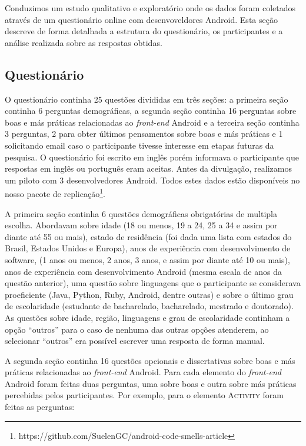 Conduzimos um estudo qualitativo e explorat\'orio onde os dados foram coletados atrav\'es de um question\'ario online com desenvoveldores Android. Esta se\c{c}\~ao descreve de forma detalhada a estrutura do question\'ario, os participantes e a an\'alise realizada sobre as respostas obtidas.

\subsection{Question\'ario}
\label{sub:questionario}

O question\'ario continha 25 quest\~oes divididas em tr\^es se\c{c}\~oes: a primeira se\c{c}\~ao continha 6 perguntas demogr\'aficas, a segunda se\c{c}\~ao continha 16 perguntas sobre boas e m\'as pr\'aticas relacionadas ao \textit{front-end} Android e a terceira se\c{c}\~ao continha 3 perguntas, 2 para obter \'ultimos pensamentos sobre boas e m\'as pr\'aticas e 1 solicitando email caso o participante tivesse interesse em etapas futuras da pesquisa. O question\'ario foi escrito em ingl\^es por\'em informava o participante que respostas em ingl\^es ou portugu\^es eram aceitas. Antes da divulga\c{c}\~ao, realizamos um piloto com 3 desenvolvedores Android. Todos estes dados est\~ao dispon\'iveis no nosso pacote de replica\c{c}\~ao\footnote{https://github.com/SuelenGC/android-code-smells-article}.

A primeira se\c{c}\~ao continha 6 quest\~oes demogr\'aficas obrigat\'orias de multipla escolha. Abordavam sobre idade (18 ou menos, 19 a 24, 25 a 34 e assim por diante at\'e 55 ou mais), estado de resid\^encia (foi dada uma lista com estados do Brasil, Estados Unidos e Europa), anos de experi\^encia com desenvolvimento de software, (1 anos ou menos, 2 anos, 3 anos, e assim por diante at\'e 10 ou mais), anos de experi\^encia com desenvolvimento Android (mesma escala de anos da quest\~ao anterior), uma quest\~ao sobre linguagens que o participante se considerava proeficiente (Java, Python, Ruby, Android, dentre outras) e sobre o \'ultimo grau de escolaridade (estudante de bacharelado, bacharelado, mestrado e doutorado). As quest\~oes sobre idade, regi\~ao, linguagens e grau de escolaridade continham a op\c{c}\~ao ``outros'' para o caso de nenhuma das outras op\c{c}\~oes atenderem, ao selecionar ``outros'' era poss\'ivel escrever uma resposta de forma manual.

A segunda se\c{c}\~ao continha 16 quest\~oes opcionais e dissertativas sobre boas e m\'as pr\'aticas relacionadas ao \textit{front-end} Android. Para cada elemento do \textit{front-end} Android foram feitas duas perguntas, uma sobre boas e outra sobre m\'as pr\'aticas percebidas pelos participantes. Por exemplo, para o elemento \textsc{Activity} foram feitas as perguntas:

